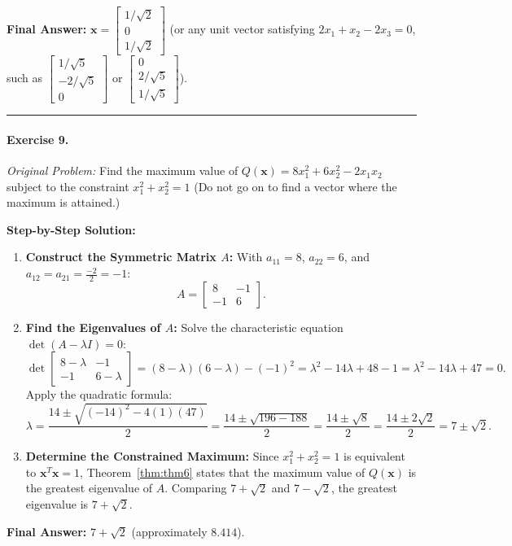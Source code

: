 \documentclass[11pt, letterpaper]{article}
\theoremstyle{definition}
\theoremstyle{remark}
\begin{document}
\textbf{Final Answer:} $\mathbf{x} = \begin{bmatrix} 1/\sqrt{2} \\ 0 \\ 1/\sqrt{2} \end{bmatrix}$ (or any unit vector satisfying $2x_1 + x_2 - 2x_3 = 0$, such as $\begin{bmatrix} 1/\sqrt{5} \\ -2/\sqrt{5} \\ 0 \end{bmatrix}$ or $\begin{bmatrix} 0 \\ 2/\sqrt{5} \\ 1/\sqrt{5} \end{bmatrix}$).

\medskip
\hrule
\medskip

\paragraph{Exercise 9.}
\emph{Original Problem:} Find the maximum value of $Q(\mathbf{x}) = 8x_1^2 + 6x_2^2 - 2x_1 x_2$ subject to the constraint $x_1^2 + x_2^2 = 1$ (Do not go on to find a vector where the maximum is attained.)

\textbf{Step-by-Step Solution:}
\begin{enumerate}[leftmargin=2em]
    \item \textbf{Construct the Symmetric Matrix $A$:}
    With $a_{11} = 8$, $a_{22} = 6$, and $a_{12} = a_{21} = \frac{-2}{2} = -1$:
    \[
    A = \begin{bmatrix} 8 & -1 \\ -1 & 6 \end{bmatrix}.
    \]
    \item \textbf{Find the Eigenvalues of $A$:}
    Solve the characteristic equation $\det(A - \lambda I) = 0$:
    \[
    \det \begin{bmatrix} 8 - \lambda & -1 \\ -1 & 6 - \lambda \end{bmatrix} = (8 - \lambda)(6 - \lambda) - (-1)^2 = \lambda^2 - 14\lambda + 48 - 1 = \lambda^2 - 14\lambda + 47 = 0.
    \]
    Apply the quadratic formula:
    \[
    \lambda = \frac{14 \pm \sqrt{(-14)^2 - 4(1)(47)}}{2} = \frac{14 \pm \sqrt{196 - 188}}{2} = \frac{14 \pm \sqrt{8}}{2} = \frac{14 \pm 2\sqrt{2}}{2} = 7 \pm \sqrt{2}.
    \]
    \item \textbf{Determine the Constrained Maximum:}
    Since $x_1^2 + x_2^2 = 1$ is equivalent to $\mathbf{x}^T \mathbf{x} = 1$, Theorem~\ref{thm:thm6} states that the maximum value of $Q(\mathbf{x})$ is the greatest eigenvalue of $A$. Comparing $7 + \sqrt{2}$ and $7 - \sqrt{2}$, the greatest eigenvalue is $7 + \sqrt{2}$.
\end{enumerate}
\textbf{Final Answer:} $7 + \sqrt{2}$ (approximately $8.414$).
\end{document}
